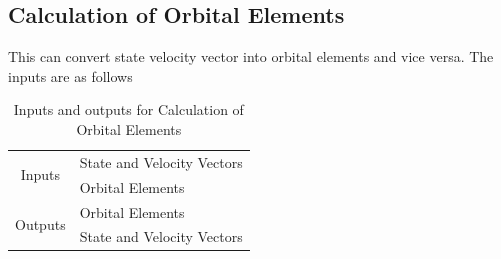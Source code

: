 \documentclass[12pt]{article}
\begin{document}
\subsection{Calculation of Orbital Elements}
This can convert state velocity vector into orbital elements and vice versa. The inputs are as follows
\begin{table}[H]
\centering
\begin{tabular}{@{}cl@{}}
\toprule
\multirow{2}{*}{Inputs} & State and Velocity Vectors            \\ \cmidrule(l){2-2} 
                                 & \multicolumn{1}{l}{Orbital Elements} \\ \midrule
\multicolumn{1}{r}{\multirow{2}{*}{Outputs}} & \multicolumn{1}{l}{Orbital Elements} \\ \cmidrule(l){2-2} 
\multicolumn{1}{r}{}           & State and Velocity Vectors            \\ \bottomrule
\end{tabular}\caption{Inputs and outputs for Calculation of Orbital Elements}
\end{table}
\begin{figure}[H]
\begin{floatrow}
\end{floatrow}
\end{figure}
\end{document}
